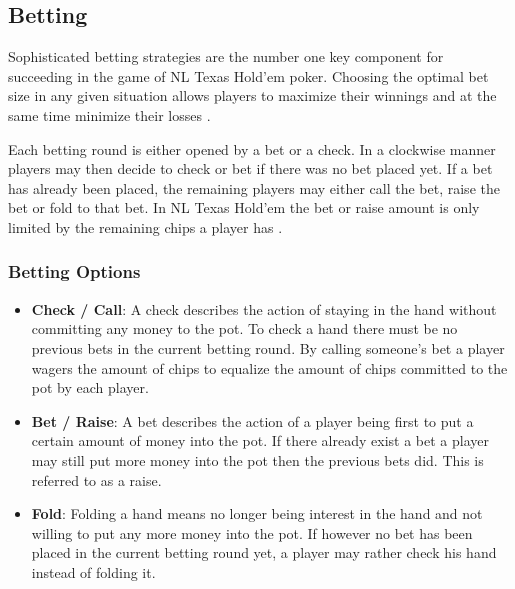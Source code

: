 \subsection{Betting}
Sophisticated betting strategies are the number one key component for succeeding in the game of NL Texas Hold'em poker. Choosing the optimal bet size in any given situation allows players to maximize their winnings and at the same time minimize their losses \cite{master_nuno}. \par
Each betting round is either opened by a bet or a check. In a clockwise manner players may then decide to check or bet if there was no bet placed yet. If a bet has already been placed, the remaining players may either call the bet, raise the bet or fold to that bet. In NL Texas Hold'em the bet or raise amount is only limited by the remaining chips a player has \cite{poker_dummies}. \par
\subsubsection{Betting Options}
\begin{itemize}
\item \textbf{Check / Call}:
A check describes the action of staying in the hand without committing any money to the pot. To check a hand there must be no previous bets in the current betting round. By calling someone's bet a player wagers the amount of chips to equalize the amount of chips committed to the pot by each player.\\ 
\item \textbf{Bet / Raise}:
A bet describes the action of a player being first to put a certain amount of money into the pot. If there already exist a bet a player may still put more money into the pot then the previous bets did. This is referred to as a raise. \\ 
\item \textbf{Fold}:
Folding a hand means no longer being interest in the hand and not willing to put any more money into the pot. If however no bet has been placed in the current betting round yet, a player may rather check his hand instead of folding it. 
\end{itemize}
\cite{review, poker_dummies} 
